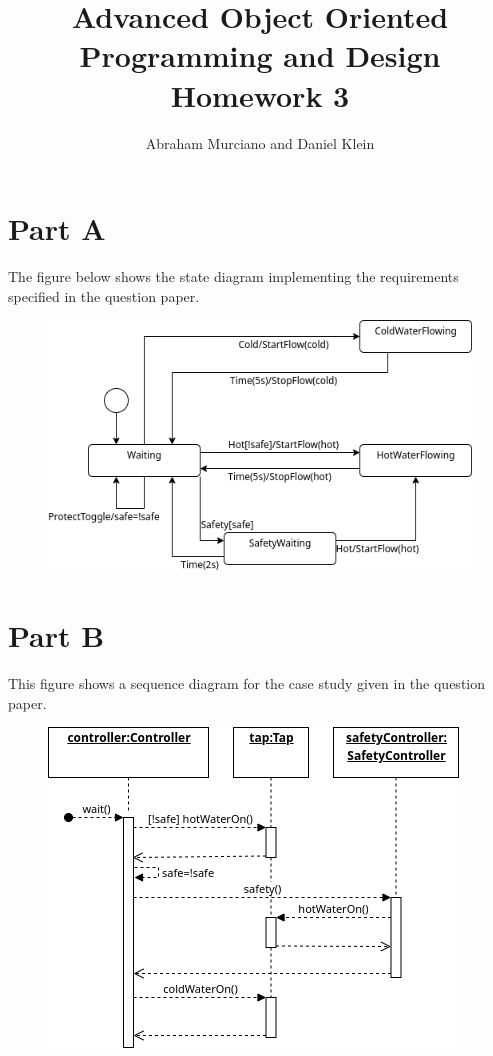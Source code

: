 \documentclass{article}
\title{Advanced Object Oriented Programming and Design\\
\medskip
\large Homework 3}
\author{Abraham Murciano and Daniel Klein}
\begin{document}
\maketitle

\section{Part A}

The figure below shows the state diagram implementing the requirements specified in the question paper.

\begin{figure}[ht]
	\includegraphics[width=\textwidth]{state-chart.png}
\end{figure}

\section{Part B}

This figure shows a sequence diagram for the case study given in the question paper.

\begin{figure}[ht]
	\includegraphics[width=\textwidth]{sequence-diagram.png}
\end{figure}
\end{document}
